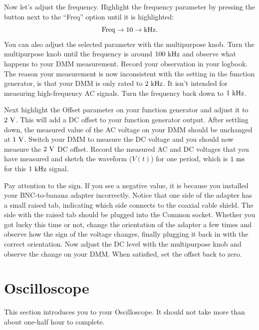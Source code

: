 \begin{measurement}
Now let's adjust the frequency. Highlight the frequency parameter by
pressing the button next to the ``Freq'' option until it is
highlighted:
\begin{displaymath}
\rm Freq \to 10 \to kHz.
\end{displaymath}
You can also adjust the selected parameter with the multipurpose knob.
Turn the multipurpose knob until the frequency is around $100~\rm kHz$
and observe what happens to your DMM measurement.  Record your
observation in your logbook. The reason your measurement is now
inconsistent with the setting in the function generator, is that your
DMM is only rated to $2~\rm kHz$.  It isn't intended for measuring
high-frequency AC signals.  Turn the frequency back down to $1~\rm
kHz$.
\end{measurement}

\begin{measurement}
Next highlight the Offset parameter on your function generator and
adjust it to $2~\rm V$.  This will add a DC offset to your function
generator output.  After settling down, the measured value of the AC
voltage on your DMM should be unchanged at $1~\rm V$.  Switch your DMM
to measure the DC voltage and you should now measure the $2~\rm V$ DC
offset.  Record the measured AC and DC voltages that you have measured
and sketch the waveform ($V(t)$) for one period, which is $1~\rm ms$
for this $1~\rm kHz$ signal.

Pay attention to the sign.  If you see a negative value, it is because
you installed your BNC-to-banana adapter incorrectly.  Notice that one
side of the adapter has a small raised tab, indicating which side
connects to the coaxial cable shield.  The side with the raised tab
should be plugged into the Common socket.  Whether you got lucky this
time or not, change the orientation of the adapter a few times and
observe how the sign of the voltage changes, finally plugging it back
in with the correct orientation. Now adjust the DC level with the
multipurpose knob and observe the change on your DMM.  When satisfied,
set the offset back to zero. 
\end{measurement}

\section{Oscilloscope}

This section introduces you to your Oscilloscope.  It should not take
more than about one-half hour to complete.

